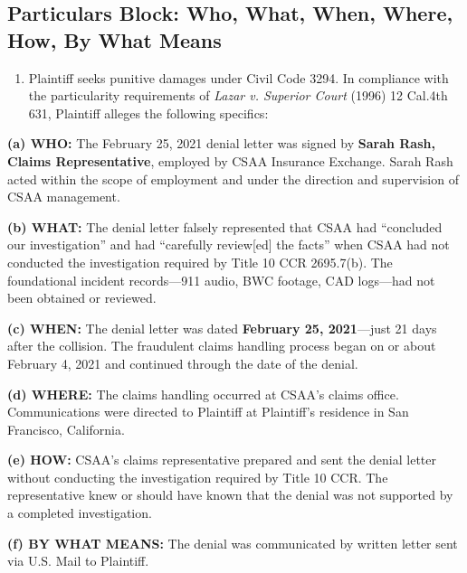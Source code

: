\subsection{Particulars Block: Who, What, When, Where, How, By What Means}\label{particulars-block-who-what-when-where-how-by-what-means}

\begin{enumerate}
\def\labelenumi{\arabic{enumi}.}
\setcounter{enumi}{24}
\tightlist
\item
  Plaintiff seeks punitive damages under Civil Code \textsection{} 3294. In compliance with the particularity requirements of \emph{Lazar v. Superior Court} (1996) 12 Cal.4th 631, Plaintiff alleges the following specifics:
\end{enumerate}

\textbf{(a) WHO:} The February 25, 2021 denial letter was signed by \textbf{Sarah Rash, Claims Representative}, employed by CSAA Insurance Exchange. Sarah Rash acted within the scope of employment and under the direction and supervision of CSAA management.

\textbf{(b) WHAT:} The denial letter falsely represented that CSAA had ``concluded our investigation'' and had ``carefully review{[}ed{]} the facts'' when CSAA had not conducted the investigation required by Title 10 CCR \textsection{} 2695.7(b). The foundational incident records---911 audio, BWC footage, CAD logs---had not been obtained or reviewed.

\textbf{(c) WHEN:} The denial letter was dated \textbf{February 25, 2021}---just 21 days after the collision. The fraudulent claims handling process began on or about February 4, 2021 and continued through the date of the denial.

\textbf{(d) WHERE:} The claims handling occurred at CSAA's claims office. Communications were directed to Plaintiff at Plaintiff's residence in San Francisco, California.

\textbf{(e) HOW:} CSAA's claims representative prepared and sent the denial letter without conducting the investigation required by Title 10 CCR. The representative knew or should have known that the denial was not supported by a completed investigation.

\textbf{(f) BY WHAT MEANS:} The denial was communicated by written letter sent via U.S. Mail to Plaintiff.


